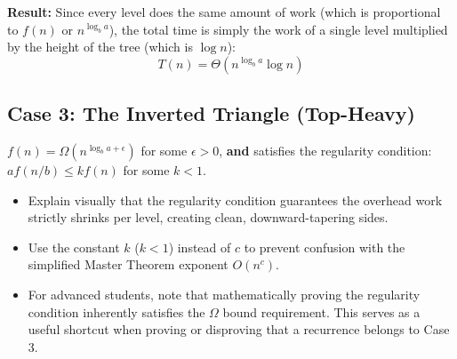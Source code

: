 \documentclass[11pt, a4paper]{article}
\begin{document}
\textbf{Result:} Since every level does the same amount of work (which is proportional to $f(n)$ or $n^{\log_b a}$), the total time is simply the work of a single level multiplied by the height of the tree (which is $\log n$):
\begin{equation*}
    T(n) = \Theta(n^{\log_b a} \log n)
\end{equation*}

\vspace{0.5cm}
\begin{center}
\end{center}
\vspace{0.5cm}

\subsection*{Case 3: The Inverted Triangle (Top-Heavy)}

\begin{tcolorbox}[colback=accent2!10, colframe=accent2, title=\textbf{Condition}]
$f(n) = \Omega(n^{\log_b a + \epsilon})$ for some $\epsilon > 0$, \textbf{and} satisfies the regularity condition: $a f(n/b) \le k f(n)$ for some $k < 1$.
\end{tcolorbox}

\begin{educatortip}
\begin{itemize}
    \item Explain visually that the regularity condition guarantees the overhead work strictly shrinks per level, creating clean, downward-tapering sides. 

    \item Use the constant $k$ ($k < 1$) instead of $c$ to prevent confusion with the simplified Master Theorem exponent $O(n^c)$. 

    \item  For advanced students, note that mathematically proving the regularity condition inherently satisfies the $\Omega$ bound requirement. This serves as a useful shortcut when proving or disproving that a recurrence belongs to Case 3.
\end{itemize}
\end{educatortip}
\end{document}
